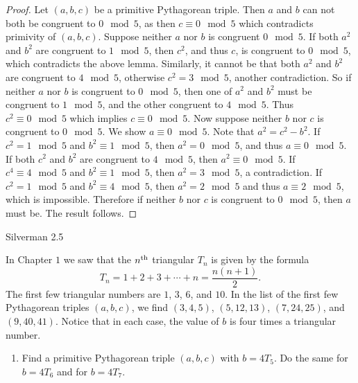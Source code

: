 \documentclass[10pt,twoside]{amsart}
\begin{document}
\begin{exercises}
\begin{enumerate}[label=(\alph*)]
{\begin{minipage}{\dimexpr\linewidth-2\fboxrule-2\fboxsep}
    \begin{proof}
        Let $(a,b,c)$ be a primitive Pythagorean triple. Then $a$ and $b$ can not both be congruent to $0 \mod 5$, as then $c \equiv 0 \mod 5$ which contradicts primivity of $(a,b,c)$. Suppose neither $a$ nor $b$ is congruent $0 \mod 5$.
If both $a^2$ and $b^2$ are congruent to $1 \mod 5$, then $c^2$, and thus $c$, is congruent to $0 \mod 5$, which contradicts the above lemma. Similarly, it cannot be that both $a^2$ and $b^2$ are congruent to $4 \mod 5$, otherwise $c^2 = 3 \mod 5$, another contradiction. So if neither $a$ nor $b$
is congruent to $0 \mod 5$, then one of $a^2$ and $b^2$ must be congruent to $1 \mod 5$, and the other congruent to $4 \mod 5$.
Thus $c^2 \equiv 0 \mod 5$ which implies $c \equiv 0 \mod 5$. Now suppose neither $b$ nor $c$ is congruent to $0 \mod 5$.
We show $a \equiv 0 \mod 5$. Note that $a^2 = c^2 -b^2$. If $c^2 = 1 \mod 5$ and $b^2 \equiv 1 \mod 5$, then $a^2 = 0 \mod 5$, and thus
$a \equiv 0 \mod 5$. If both $c^2$ and $b^2$ are congruent to $4 \mod 5$, then $a^2 \equiv 0 \mod 5$. If $c^4 \equiv 4 \mod 5$ and
$b^2 \equiv 1 \mod 5$, then $a^2 = 3 \mod 5$, a contradiction.
If $c^2 = 1 \mod 5$ and $b^2 \equiv 4 \mod 5$, then $a^2 = 2 \mod 5$ and thus $a \equiv 2 \mod 5$, which is impossible. Therefore if neither $b$ nor $c$ is congruent to $0 \mod 5$, then $a$ must be. The result follows.
    \end{proof}
\end{minipage}}


    \end{enumerate}



\item Silverman 2.5

    In Chapter $1$ we saw that the $n^{\textnormal{th}}$ triangular $T_n$ is given by the formula
    \[T_n = 1 + 2 + 3 + \cdots + n = \frac{n(n+1)}{2}.\]
    The first few triangular numbers are $1$, $3$, $6$, and $10$. In the list of the first few Pythagorean triples $(a,b,c)$, we find $(3,4,5)$, $(5,12,13)$, $(7,24,25)$, and $(9,40,41)$. Notice that in each case, the value of $b$ is four times a triangular number.


\begin{enumerate}[label = (\alph*)]
    \item Find a primitive Pythagorean triple $(a,b,c)$ with $b=4T_5$. Do the same for $b=4T_6$ and for $b=4T_7$.

    
    

\end{enumerate}
\end{exercises}
\end{document}
